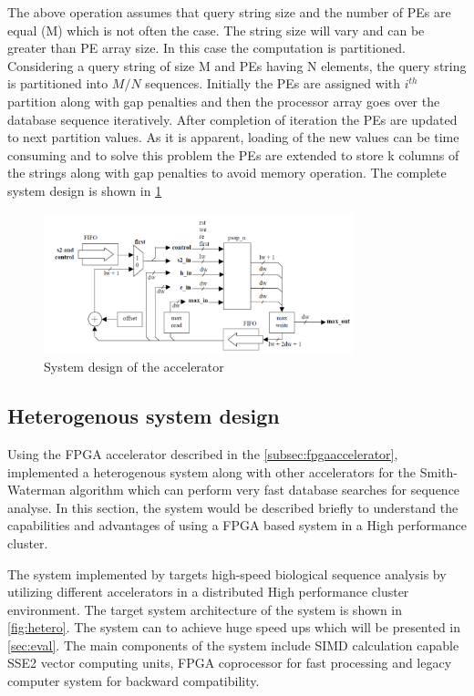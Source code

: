 \documentclass[12pt,twoside]{article}
\begin{document}
The above operation assumes that query string size and the number of PEs are equal (M) which is not often the case. The string size will vary and 
can be greater than PE array size. In this case the computation is partitioned. Considering a query string of size M and PEs having N elements,
the query string is partitioned into $ M/N $ sequences. Initially the PEs are assigned with $ i^{th} $ partition along with gap penalties and
then the processor array goes over the database sequence iteratively. After completion of iteration the PEs are updated to next partition values.
As it is apparent, loading of the new values can be time consuming and to solve this problem the PEs are extended to store k columns of the strings along
with gap penalties to avoid memory operation. The complete system design is shown in \cref{fig:systemdesign} 

\begin{figure}[h]%
    \centering
    \includegraphics[width=0.8\textwidth]{fig/systemdesign}
    \caption{System design of the accelerator \cite[Figure 4]{oliver_hyper_2005}}
    \label{fig:systemdesign}
\end{figure}

\subsection{Heterogenous system design}
\label{sec:hetero}

Using the FPGA accelerator described in the \cref{subsec:fpgaaccelerator}, \textcite{meng_high-performance_2010} implemented a heterogenous system
along with other accelerators for the Smith-Waterman algorithm which can perform very fast database searches for sequence analyse.
In this section, the system would be described briefly to understand the capabilities and advantages of using a FPGA based system in a 
High performance cluster.

The system implemented by \textcite{meng_high-performance_2010} targets high-speed biological sequence analysis by utilizing different accelerators
in a distributed High performance cluster environment. The target system architecture of the system is shown in \cref{fig:hetero}. The system can
to achieve huge speed ups which will be presented in \cref{sec:eval}. The main components of the system include SIMD calculation capable
SSE2 vector computing units, FPGA coprocessor for fast processing and legacy computer system for backward compatibility.
\end{document}
